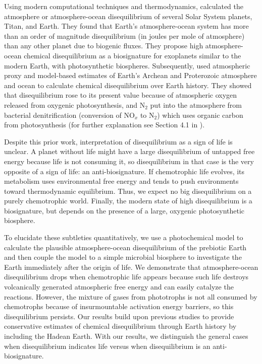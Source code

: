 Using modern computational techniques and thermodynamics, \citet{KrissansenTotton_2016} calculated the atmosphere or atmosphere-ocean disequilibrium of several Solar System planets, Titan, and Earth. They found that Earth's atmosphere-ocean system has more than an order of magnitude disequilibrium (in joules per mole of atmosphere) than any other planet due to biogenic fluxes. They propose high atmosphere-ocean chemical disequilibrium as a biosignature for exoplanets similar to the modern Earth, with photosynthetic biospheres. Subsequently, \citet{KrissansenTotton_2018_diseq} used atmospheric proxy and model-based estimates of Earth's Archean and Proterozoic atmosphere and ocean to calculate chemical disequilibrium over Earth history. They showed that disequilibrium rose to its present value because of atmospheric oxygen released from oxygenic photosynthesis, and N$_2$ put into the atmosphere from bacterial denitrification (conversion of NO$_x$ to N$_2$) which uses organic carbon from photosynthesis (for further explanation see Section 4.1 in \citet{KrissansenTotton_2016}).

Despite this prior work, interpretation of disequilibrium as a sign of life is unclear. A planet without life might have a large disequilibrium of untapped free energy because life is not consuming it, so disequilibrium in that case is the very opposite of a sign of life: an anti-biosignature. If chemotrophic life evolves, its metabolism uses environmental free energy and tends to push environments toward thermodynamic equilibrium. Thus, we expect no big disequilibrium on a purely chemotrophic world. Finally, the modern state of high disequilibrium is a biosignature, but depends on the presence of a large, oxygenic photosynthetic biosphere.

To elucidate these subtleties quantitatively, we use a photochemical model to calculate the plausible atmosphere-ocean disequilibrium of the prebiotic Earth and then couple the model to a simple microbial biosphere to investigate the Earth immediately after the origin of life. We demonstrate that atmosphere-ocean disequilibrium drops when chemotrophic life appears because such life destroys volcanically generated atmospheric free energy and can easily catalyze the reactions. However, the mixture of gases from phototrophs is not all consumed by chemotrophs because of insurmountable activation energy barriers, so this disequilibrium persists. Our results build upon previous studies \citep{KrissansenTotton_2016,KrissansenTotton_2018_diseq} to provide conservative estimates of chemical disequilibrium through Earth history by including the Hadean Earth. With our results, we distinguish the general cases when disequilibrium indicates life versus when disequilibrium is an anti-biosignature. 

